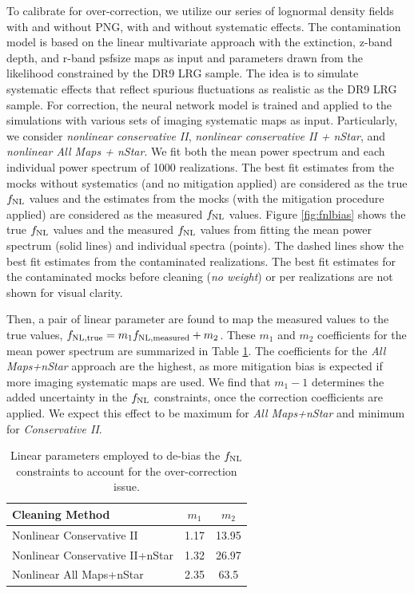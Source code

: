 To calibrate for over-correction, we utilize our series of lognormal density fields with and without PNG, with and without systematic effects. The contamination model is based on the linear multivariate approach with the extinction, z-band depth, and r-band psfsize maps as input and parameters drawn from the likelihood constrained by the DR9 LRG sample. The idea is to simulate systematic effects that reflect spurious fluctuations as  realistic as the DR9 LRG sample. For correction, the neural network model is trained and applied to the simulations with various sets of imaging systematic maps as input. Particularly, we consider \textit{nonlinear conservative II}, \textit{nonlinear conservative II + nStar}, and \textit{nonlinear All Maps + nStar}. We fit both the mean power spectrum and each individual power spectrum of 1000 realizations. The best fit estimates from the mocks without systematics (and no mitigation applied) are considered as the true $f_{\rm NL}$ values and the estimates from the mocks (with the mitigation procedure applied) are considered as the measured $f_{\rm NL}$ values. Figure \ref{fig:fnlbias} shows the true $f_{\rm NL}$ values and the measured $f_{\rm NL}$ values from fitting the mean power spectrum (solid lines) and individual spectra (points). The dashed lines show the best fit estimates from the contaminated realizations. The best fit estimates for the contaminated mocks before cleaning (\textit{no weight}) or per realizations are not shown for visual clarity. 

Then, a pair of linear parameter are found to map the measured values to the true values, $f_{\rm NL, true} = m_{1} f_{\rm NL, measured} + m_{2}$. These $m_{1}$ and $m_{2}$ coefficients for the mean power spectrum are summarized in Table \ref{tab:debiasparams}. The coefficients for the \textit{All Maps+nStar} approach are the highest, as more mitigation bias is expected if more imaging systematic maps are used. We find that $m_{1}-1$ determines the added uncertainty in the $f_{\rm NL}$ constraints, once the correction coefficients are applied. We expect this effect to be maximum for \textit{All Maps+nStar} and minimum for \textit{Conservative II}.

\begin{table}
\begin{center}
\caption{Linear parameters employed to de-bias the $f_{\rm NL}$ constraints to account for the over-correction issue.}\label{tab:debiasparams}
\begin{tabular}{lcc}
\hline
\hline
\textbf{Cleaning Method} & $m_{1}$ & $m_{2}$ \\
\hline
Nonlinear Conservative II & 1.17 & 13.95 \\
Nonlinear Conservative II+nStar & 1.32 & 26.97 \\
Nonlinear All Maps+nStar & 2.35 & 63.5\\
\hline
\end{tabular}
\end{center}
\end{table}